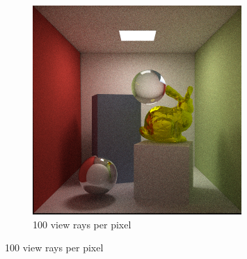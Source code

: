 \documentclass[a4paper, 12pt]{report}
\begin{document}
\begin{figure}
\begin{subfigure}[h]{0.5\textwidth}
                \includegraphics[width=\textwidth]{figures/specular_100rpp-.png}
                \caption{100 view rays per pixel}
                \label{fig:100rpp}
        \end{subfigure}


\end{figure}
\end{document}
